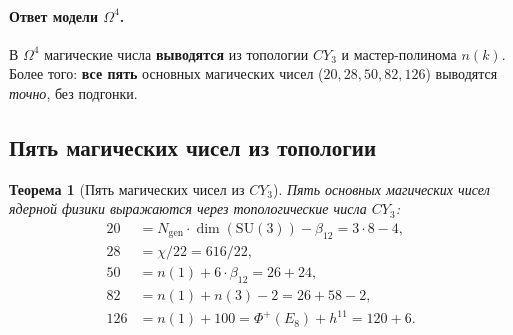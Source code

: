 \documentclass[11pt,a4paper]{article}
\newcommand{\SU}{\mathrm{SU}}
\newcommand{\CY}{CY_3}
\newcommand{\Om}{\Omega^4}
\newcommand{\Ngen}{N_{\text{gen}}}
\newtheorem{theorem}{Теорема}[section]
\theoremstyle{definition}
\begin{document}
\paragraph{Ответ модели $\Om$.}
В $\Om$ магические числа \textbf{выводятся} из топологии $\CY$ 
и мастер-полинома $n(k)$. Более того: \textbf{все пять} основных 
магических чисел ($20, 28, 50, 82, 126$) выводятся \emph{точно}, 
без подгонки.

\subsection{Пять магических чисел из топологии}
\label{subsec:magic-five}

\begin{theorem}[Пять магических чисел из $\CY$]
\label{thm:magic-five}
Пять основных магических чисел ядерной физики выражаются 
через топологические числа $\CY$:
\begin{align}
    20 &= \Ngen \cdot \dim(\SU(3)) - \beta_{12}
        = 3 \cdot 8 - 4,
    \label{eq:magic-20} \\[0.3em]
    28 &= \chi / 22 = 616 / 22,
    \label{eq:magic-28} \\[0.3em]
    50 &= n(1) + 6 \cdot \beta_{12} = 26 + 24,
    \label{eq:magic-50} \\[0.3em]
    82 &= n(1) + n(3) - 2 = 26 + 58 - 2,
    \label{eq:magic-82} \\[0.3em]
    126 &= n(1) + 100 = \Phi^+(E_8) + h^{11} = 120 + 6.
    \label{eq:magic-126}
\end{align}
\end{theorem}
\end{document}
